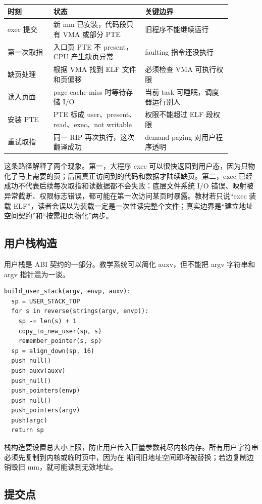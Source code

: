 \begin{longtable}{|p{0.18\linewidth}|p{0.36\linewidth}|p{0.34\linewidth}|}
\toprule
时刻 & 状态 & 关键边界 \\
\midrule
exec 提交 & 新 mm 已安装，代码段只有 VMA 或部分 PTE & 旧程序不能继续运行 \\\tablerowrule
第一次取指 & 入口页 PTE 不 present，CPU 产生缺页异常 & faulting 指令还没执行 \\\tablerowrule
缺页处理 & 根据 VMA 找到 ELF 文件和页偏移 & 必须检查 VMA 可执行权限 \\\tablerowrule
读入页面 & page cache miss 时等待存储 I/O & 当前 task 可睡眠，调度器运行别人 \\\tablerowrule
安装 PTE & PTE 标成 user、present、read、exec、not writable & 权限不能超过 ELF 段权限 \\\tablerowrule
重试取指 & 同一 RIP 再次执行，这次翻译成功 & demand paging 对用户程序透明 \\
\bottomrule
\end{longtable}

这条路径解释了两个现象。第一，大程序 exec 可以很快返回到用户态，因为只物化了马上需要的页；后面真正访问到的代码和数据才陆续缺页。第二，exec 已经成功不代表后续每次取指和读数据都不会失败：底层文件系统 I/O 错误、映射被异常截断、权限标志错误，都可能在第一次访问某页时暴露。教材若只说“exec 装载 ELF”，读者会误以为装载一定是一次性读完整个文件；真实边界是“建立地址空间契约”和“按需把页物化”两步。

\subsection{用户栈构造}

用户栈是 ABI 契约的一部分。教学系统可以简化 auxv，但不能把 argv 字符串和 argv 指针混为一谈。

\begin{lstlisting}
build_user_stack(argv, envp, auxv):
  sp = USER_STACK_TOP
  for s in reverse(strings(argv, envp)):
    sp -= len(s) + 1
    copy_to_new_user(sp, s)
    remember_pointer(s, sp)
  sp = align_down(sp, 16)
  push_null()
  push_auxv(auxv)
  push_null()
  push_pointers(envp)
  push_null()
  push_pointers(argv)
  push(argc)
  return sp
\end{lstlisting}

栈构造要设置总大小上限，防止用户传入巨量参数耗尽内核内存。所有用户字符串必须先复制到内核或临时页中，因为在  期间旧地址空间即将被替换；若边复制边销毁旧 mm，就可能读到无效地址。

\subsection{提交点}

